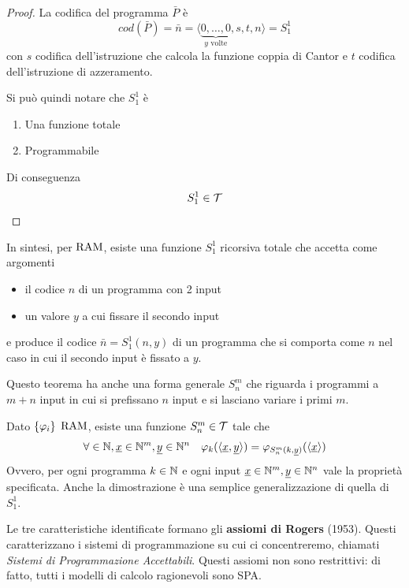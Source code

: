 \begin{proof}
	La codifica del programma $\bar{P}$ è
	$$ cod(\bar{P}) = \bar{n} = \langle \underbrace{0,\dots,0}_{y\text{ volte}},s,t,n \rangle = S^1_1 $$
	con $s$ codifica dell'istruzione che calcola la funzione coppia di Cantor e $t$ codifica dell'istruzione di azzeramento.

	Si può quindi notare che $S_1^1$ è
	\begin{enumerate}
		\item Una funzione totale
		\item Programmabile
	\end{enumerate}
	Di conseguenza
	$$ S_1^1 \in \mathcal{T} $$
\end{proof}

In sintesi, per $\text{RAM}$, esiste una funzione $S_1^1$ ricorsiva totale che accetta come argomenti
\begin{itemize}
	\item il codice $n$ di un programma con 2 input
	\item un valore $y$ a cui fissare il secondo input
\end{itemize}
e produce il codice $\bar{n} = S^1_1 (n,y)$ di un programma che si comporta come $n$ nel caso in cui il secondo input è fissato a $y$. 

Questo teorema ha anche una forma generale $S_n^m$ che riguarda i programmi a $m+n$ input in cui si prefissano $n$ input e si lasciano variare i primi $m$.\\

\begin{theor}[$S_n^m$]
	Dato $\{\varphi_i\}$ $\text{RAM}$, esiste una funzione $S_n^m \in \mathcal{T}$ tale che
	$$ \forall  \in \mathbb{N}, \underline{x} \in \mathbb{N}^m, \underline{y} \in \mathbb{N}^n \quad \varphi_k (\langle \underline{x}, \underline{y} \rangle) = \varphi_{S_n^m (k, \underline{y})} (\langle \underline{x} \rangle) $$
	Ovvero, per ogni programma $k \in \mathbb{N}$ e ogni input $\underline{x} \in \mathbb{N}^m, \underline{y} \in \mathbb{N}^n$ vale la proprietà specificata. Anche la dimostrazione è una semplice generalizzazione di quella di $S_1^1$.\\
\end{theor}

Le tre caratteristiche identificate formano gli \textbf{assiomi di Rogers} (1953). Questi caratterizzano i sistemi di programmazione su cui ci concentreremo, chiamati \textit{Sistemi di Programmazione Accettabili}. Questi assiomi non sono restrittivi: di fatto, tutti i modelli di calcolo ragionevoli sono SPA.

